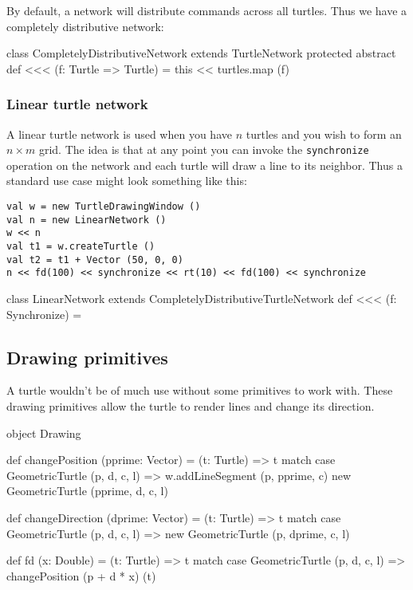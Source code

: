 \documentclass{article}
\begin{document}
      By default, a network will distribute commands across all turtles. Thus we have a completely distributive network:

      \begin{scalacode}
class CompletelyDistributiveNetwork extends TurtleNetwork {
  protected abstract def <<< (f: Turtle => Turtle) = this << turtles.map (f)
}
      \end{scalacode}

      \subsubsection{Linear turtle network}
        \label{sec:linear-turtle-network}

        A linear turtle network is used when you have $n$ turtles and you wish to form an $n\times m$ grid. The idea is that at any point you can invoke the
        {\tt synchronize} operation on the network and each turtle will draw a line to its neighbor. Thus a standard use case might look something like this:

        \begin{verbatim}
val w = new TurtleDrawingWindow ()
val n = new LinearNetwork ()
w << n
val t1 = w.createTurtle ()
val t2 = t1 + Vector (50, 0, 0)
n << fd(100) << synchronize << rt(10) << fd(100) << synchronize
        \end{verbatim}

        \begin{scalacode}
class LinearNetwork extends CompletelyDistributiveTurtleNetwork {
  def <<< (f: Synchronize) = 
}
        \end{scalacode}

    \subsection{Drawing primitives}
      \label{sec:drawing-primitives}

      A turtle wouldn't be of much use without some primitives to work with. These drawing primitives allow the turtle to render lines and change its direction.

      \begin{scalacode}
object Drawing {
  def changePosition (pprime: Vector) = (t: Turtle) => t match {
    case GeometricTurtle (p, d, c, l) => {w.addLineSegment (p, pprime, c)
                                          new GeometricTurtle (pprime, d, c, l)}}

  def changeDirection (dprime: Vector) = (t: Turtle) => t match {
    case GeometricTurtle (p, d, c, l) => new GeometricTurtle (p, dprime, c, l)}

  def fd (x: Double) = (t: Turtle) => t match {
    case GeometricTurtle (p, d, c, l) => changePosition (p + d * x) (t)}
}
      \end{scalacode}
\end{document}
